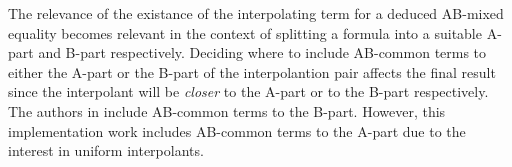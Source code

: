 The relevance of the existance of the interpolating term for 
a deduced AB-mixed equality becomes relevant in the context 
of splitting a formula into a suitable A-part and B-part 
respectively. 
Deciding where to include AB-common terms to either the 
A-part or the B-part of the interpolantion pair affects 
the final result since the interpolant will be \emph{closer} 
to the A-part or to the B-part respectively. The authors in 
\cite{10.1007/11532231_26} include AB-common terms to the B-part. 
However, this implementation work includes AB-common terms to the
A-part due to the interest in uniform interpolants.

